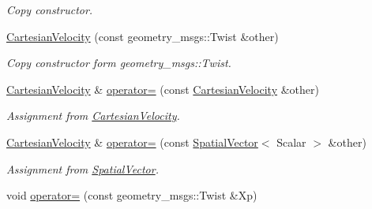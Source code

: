 \begin{DoxyCompactItemize}
\begin{DoxyCompactList}\small\item\em Copy constructor. \end{DoxyCompactList}\item 
\hyperlink{classow__core_1_1CartesianVelocity_a941e816cd2c1aacaef90fa02f75b2433}{Cartesian\+Velocity} (const geometry\+\_\+msgs\+::\+Twist \&other)\hypertarget{classow__core_1_1CartesianVelocity_a941e816cd2c1aacaef90fa02f75b2433}{}\label{classow__core_1_1CartesianVelocity_a941e816cd2c1aacaef90fa02f75b2433}

\begin{DoxyCompactList}\small\item\em Copy constructor form geometry\+\_\+msgs\+::\+Twist. \end{DoxyCompactList}\item 
\hyperlink{classow__core_1_1CartesianVelocity}{Cartesian\+Velocity} \& \hyperlink{classow__core_1_1CartesianVelocity_a5a6eae363828e0d86df8e5f11fbc64b1}{operator=} (const \hyperlink{classow__core_1_1CartesianVelocity}{Cartesian\+Velocity} \&other)\hypertarget{classow__core_1_1CartesianVelocity_a5a6eae363828e0d86df8e5f11fbc64b1}{}\label{classow__core_1_1CartesianVelocity_a5a6eae363828e0d86df8e5f11fbc64b1}

\begin{DoxyCompactList}\small\item\em Assignment from \hyperlink{classow__core_1_1CartesianVelocity}{Cartesian\+Velocity}. \end{DoxyCompactList}\item 
\hyperlink{classow__core_1_1CartesianVelocity}{Cartesian\+Velocity} \& \hyperlink{classow__core_1_1CartesianVelocity_aa50097b751399251dfb31081030ac721}{operator=} (const \hyperlink{classow__core_1_1SpatialVector}{Spatial\+Vector}$<$ Scalar $>$ \&other)\hypertarget{classow__core_1_1CartesianVelocity_aa50097b751399251dfb31081030ac721}{}\label{classow__core_1_1CartesianVelocity_aa50097b751399251dfb31081030ac721}

\begin{DoxyCompactList}\small\item\em Assignment from \hyperlink{classow__core_1_1SpatialVector}{Spatial\+Vector}. \end{DoxyCompactList}\item 
void \hyperlink{classow__core_1_1CartesianVelocity_ac4abf76a3ffb12d811c7ede84aeb0281}{operator=} (const geometry\+\_\+msgs\+::\+Twist \&Xp)\hypertarget{classow__core_1_1CartesianVelocity_ac4abf76a3ffb12d811c7ede84aeb0281}{}\label{classow__core_1_1CartesianVelocity_ac4abf76a3ffb12d811c7ede84aeb0281}


\end{DoxyCompactItemize}
